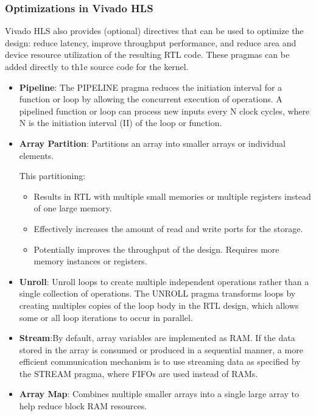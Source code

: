 \subsubsection{Optimizations in Vivado HLS}
 Vivado HLS also provides (optional) directives that can be used to optimize the design: reduce latency, improve throughput performance, and reduce area and device resource utilization of the resulting RTL code. These pragmas can be added directly to th1e source code for the kernel.  
\begin{itemize}

    \item \textbf{Pipeline}: The PIPELINE pragma reduces the initiation interval for a function or loop by allowing the concurrent execution of operations. A pipelined function or loop can process new inputs every N clock cycles, where N is the initiation interval (II) of the loop or function. 
    
    \item \textbf{Array Partition}: Partitions an array into smaller arrays or individual elements.
    
This partitioning:
\begin{itemize}
    \item Results in RTL with multiple small memories or multiple registers instead of one large memory.
    \item Effectively increases the amount of read and write ports for the storage.
    \item Potentially improves the throughput of the design.
    Requires more memory instances or registers.
\end{itemize}

    
    \item \textbf{Unroll}: Unroll loops to create multiple independent operations rather than a single collection of operations. The UNROLL pragma transforms loops by creating multiples copies of the loop body in the RTL design, which allows some or all loop iterations to occur in parallel. 
 
    \item \textbf{Stream}:By default, array variables are implemented as RAM. If the data stored in the array is consumed or produced in a sequential manner, a more efficient communication mechanism is to use streaming data as specified by the STREAM pragma, where FIFOs are used instead of RAMs.

    \item \textbf{Array Map}: Combines multiple smaller arrays into a single large array to help reduce block RAM resources.


\end{itemize}

